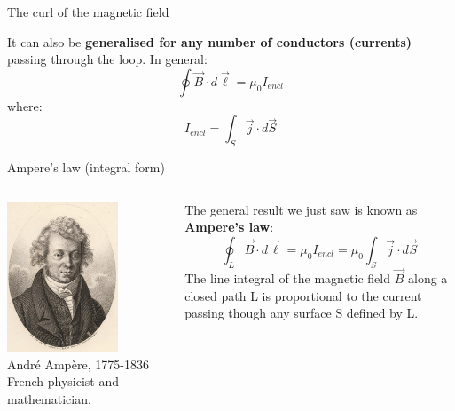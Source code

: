 \begin{frame}{The curl of the magnetic field}
\vspace{0.2cm}

It can also be {\bf generalised for any number of conductors (currents)} passing through the loop.
In general:
\begin{equation*}
    \oint \vec{B} \cdot d\vec{\ell} = \mu_0 I_{encl}
\end{equation*}
where:
\begin{equation*}
     I_{encl} = \int_{S} \vec{j} \cdot d\vec{S}
\end{equation*}

\end{frame}

%
%
%

\begin{frame}{Ampere's law (integral form)}

\begin{columns}
  \begin{column}{0.22\textwidth}
    \begin{center}
     \includegraphics[width=0.70\textwidth]{./images/people/ampere.jpg}\\
     {\scriptsize
       Andr\'e Amp\`ere, 1775-1836\\
       French physicist and mathematician.\\
     }
    \end{center}
  \end{column}
  \begin{column}{0.78\textwidth}
     The general result we just saw is known as {\bf Ampere's law}:
     \begin{equation*}
        \oint_{L} \vec{B} \cdot d\vec{\ell} = \mu_0 I_{encl} = \mu_0 \int_{S} \vec{j} \cdot d\vec{S}
     \end{equation*}
     The line integral of the magnetic field $\vec{B}$ along a closed path L is proportional to the
     current passing though any surface S defined by L.
  \end{column}
\end{columns}


\end{frame}
